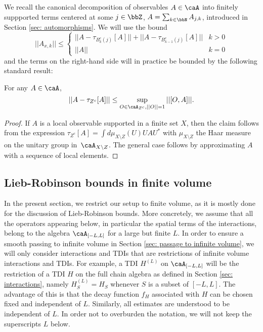 We recall the canonical decomposition of observables  $A\in\caA$ into finitely suppported terms centered at some $j\in\bbZ$,  $A=\sum_{k\in\bbN} A_{j,k}$, introduced in Section \ref{sec: automorphisms}.
We will use the bound
\begin{equation}\label{eq: bound partial}
	||A_{x,k}|| \leq  \begin{cases}  ||A-\tau_{B^c_{k}(j)}[A]|| + ||A-\tau_{B^c_{k-1}(j)}[A]||   &  k>0 \\
		|| A||  &  k=0  \end{cases}
\end{equation}
and the terms on the right-hand side will in practice be bounded by the following standard result:
\begin{lemma}\label{lem: com and norm}
	For any $A\in\caA$, 
	$$||A-\tau_{Z^c}[A]||\leq \sup_{O\in \caA_{Z^c}, ||O||=1} ||[O,A]||.$$
\end{lemma} 
\begin{proof}
	If $A$ is a local observable supported in a finite set $X$, then the claim follows from the expression
	$\tau_{Z^c}[A]=\int d\mu_{X\setminus Z}(U) UAU^*$ with $\mu_{X\setminus Z}$ the Haar measure on the unitary group in~$\caA_{X\setminus Z}$. The general case follows by approximating $A$ with a sequence of local elements. 
\end{proof}





\subsection{Lieb-Robinson bounds in finite volume} \label{sec: lr in finite volume}
In the present section, we restrict our setup to finite volume, as it is mostly done for the discussion of Lieb-Robinson bounds. More concretely, we assume that all the operators appearing below, in particular the spatial terms of the interactions, belong to the algebra $\caA_{[-L,L]}$ for a large but finite $L$. In order to ensure a smooth passing to infinite volume in Section \ref{sec: passage to infinite volume}, we will only consider interactions and TDIs that are restrictions of infinite volume interactions and TDIs. For example, a TDI $H^{(L)}$ on $\caA_{[-L,L]}$ will be the restriction of a TDI $H$ on the full chain algebra as defined in Section \ref{sec: interactions}, namely $H^{(L)}_S = H_S$ whenever $S$ is a subset of $[-L,L]$. The advantage of this is that the decay function $f_H$ associated with $H$ can be chosen fixed and independent of $L$. Similarly, all estimates are understood to be independent of $L$. In order not to overburden the notation, we will not keep the superscripts $L$ below.


